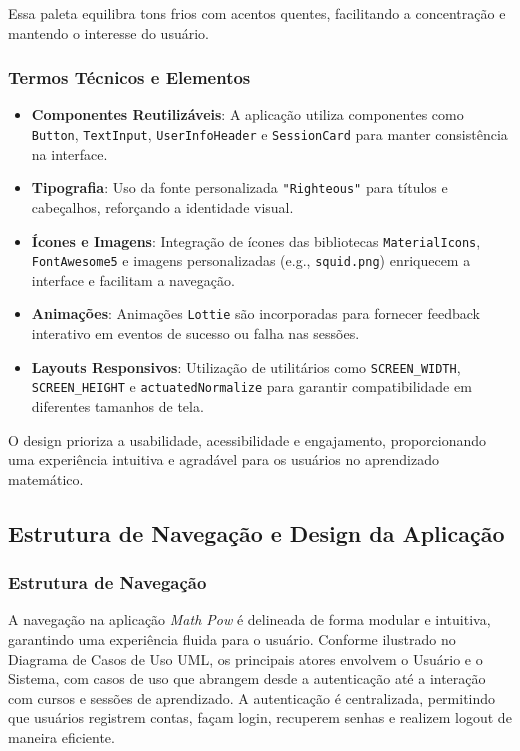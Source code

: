 Essa paleta equilibra tons frios com acentos quentes, facilitando a concentração e mantendo o interesse do usuário.

\subsubsection{Termos Técnicos e Elementos}

\begin{itemize}
    \item \textbf{Componentes Reutilizáveis}: A aplicação utiliza componentes como \texttt{Button}, \texttt{TextInput}, \texttt{UserInfoHeader} e \texttt{SessionCard} para manter consistência na interface.
    \item \textbf{Tipografia}: Uso da fonte personalizada \texttt{"Righteous"} para títulos e cabeçalhos, reforçando a identidade visual.
    \item \textbf{Ícones e Imagens}: Integração de ícones das bibliotecas \texttt{MaterialIcons}, \texttt{FontAwesome5} e imagens personalizadas (e.g., \texttt{squid.png}) enriquecem a interface e facilitam a navegação.
    \item \textbf{Animações}: Animações \texttt{Lottie} são incorporadas para fornecer feedback interativo em eventos de sucesso ou falha nas sessões.
    \item \textbf{Layouts Responsivos}: Utilização de utilitários como \texttt{SCREEN\_WIDTH}, \texttt{SCREEN\_HEIGHT} e \texttt{actuatedNormalize} para garantir compatibilidade em diferentes tamanhos de tela.
\end{itemize}

O design prioriza a usabilidade, acessibilidade e engajamento, proporcionando uma experiência intuitiva e agradável para os usuários no aprendizado matemático.

\subsection{Estrutura de Navegação e Design da Aplicação}

\subsubsection{Estrutura de Navegação}

A navegação na aplicação \textit{Math Pow} é delineada de forma modular e intuitiva, garantindo uma experiência fluida para o usuário. Conforme ilustrado no Diagrama de Casos de Uso UML, os principais atores envolvem o Usuário e o Sistema, com casos de uso que abrangem desde a autenticação até a interação com cursos e sessões de aprendizado. A autenticação é centralizada, permitindo que usuários registrem contas, façam login, recuperem senhas e realizem logout de maneira eficiente.

